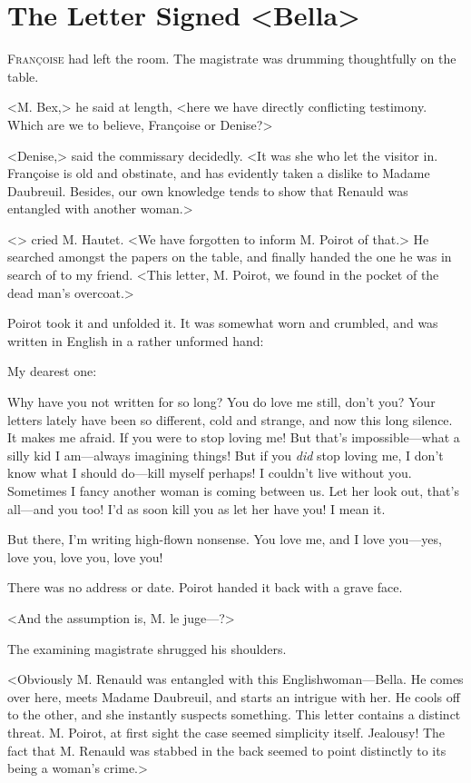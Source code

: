 \chapter{The Letter Signed <Bella>}

\lettrine{F}{rançoise} had left the room. The magistrate was drumming thoughtfully on the table. 

\zz
 <M. Bex,> he said at length, <here we have directly conflicting testimony. Which are we to believe, Françoise or Denise?> 

 <Denise,> said the commissary decidedly. <It was she who let the visitor in. Françoise is old and obstinate, and has evidently taken a dislike to Madame Daubreuil. Besides, our own knowledge tends to show that Renauld was entangled with another woman.> 

 <> cried M. Hautet. <We have forgotten to inform M. Poirot of that.> He searched amongst the papers on the table, and finally handed the one he was in search of to my friend. <This letter, M. Poirot, we found in the pocket of the dead man's overcoat.> 

 Poirot took it and unfolded it. It was somewhat worn and crumbled, and was written in English in a rather unformed hand: 
 
 \begin{mail}{}{My dearest one:}
 
 Why have you not written for so long? You do love me still, don't you? Your letters lately have been so different, cold and strange, and now this long silence. It makes me afraid. If you were to stop loving me! But that's impossible—what a silly kid I am—always imagining things! But if you \emph{did} stop loving me, I don't know what I should do—kill myself perhaps! I couldn't live without you. Sometimes I fancy another woman is coming between us. Let her look out, that's all—and you too! I'd as soon kill you as let her have you! I mean it.
 
 But there, I'm writing high-flown nonsense. You love me, and I love you—yes, love you, love you, love you!
 
\end{mail}

 There was no address or date. Poirot handed it back with a grave face. 

 <And the assumption is, M. le juge—?> 

 The examining magistrate shrugged his shoulders. 

 <Obviously M. Renauld was entangled with this Englishwoman—Bella. He comes over here, meets Madame Daubreuil, and starts an intrigue with her. He cools off to the other, and she instantly suspects something. This letter contains a distinct threat. M. Poirot, at first sight the case seemed simplicity itself. Jealousy! The fact that M. Renauld was stabbed in the back seemed to point distinctly to its being a woman's crime.> 

